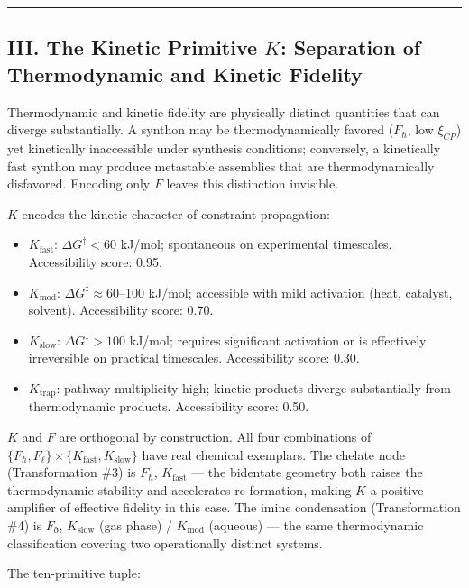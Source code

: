 \documentclass[12pt,a4paper]{article}
\begin{document}
\begin{center}
\rule{0.5\textwidth}{0.4pt}
\end{center}

\subsection{III. The Kinetic Primitive $K$: Separation of Thermodynamic and Kinetic Fidelity}

Thermodynamic and kinetic fidelity are physically distinct quantities that can diverge substantially. A synthon may be thermodynamically favored ($F_{\hbar}$, low $\xi_{CP}$) yet kinetically inaccessible under synthesis conditions; conversely, a kinetically fast synthon may produce metastable assemblies that are thermodynamically disfavored. Encoding only $F$ leaves this distinction invisible.

$K$ encodes the kinetic character of constraint propagation:

\begin{itemize}
    \item $K_{\text{fast}}$: $\Delta G^{\ddagger} < 60$ kJ/mol; spontaneous on experimental timescales. Accessibility score: 0.95.
    \item $K_{\text{mod}}$: $\Delta G^{\ddagger} \approx 60$--100 kJ/mol; accessible with mild activation (heat, catalyst, solvent). Accessibility score: 0.70.
    \item $K_{\text{slow}}$: $\Delta G^{\ddagger} > 100$ kJ/mol; requires significant activation or is effectively irreversible on practical timescales. Accessibility score: 0.30.
    \item $K_{\text{trap}}$: pathway multiplicity high; kinetic products diverge substantially from thermodynamic products. Accessibility score: 0.50.
\end{itemize}

$K$ and $F$ are orthogonal by construction. All four combinations of $\{F_{\hbar}, F_{\ell}\} \times \{K_{\text{fast}}, K_{\text{slow}}\}$ have real chemical exemplars. The chelate node (Transformation \#3) is $F_{\hbar}$, $K_{\text{fast}}$ --- the bidentate geometry both raises the thermodynamic stability and accelerates re-formation, making $K$ a positive amplifier of effective fidelity in this case. The imine condensation (Transformation \#4) is $F_{\eth}$, $K_{\text{slow}}$ (gas phase) / $K_{\text{mod}}$ (aqueous) --- the same thermodynamic classification covering two operationally distinct systems.

The ten-primitive tuple:
\end{document}

